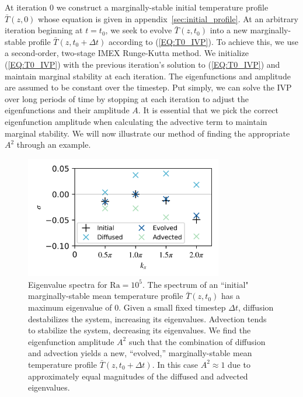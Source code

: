\documentclass[reprint,amsmath,amssymb,aps]{revtex4-1}
\newcommand\Ra{\mathrm{Ra}}
\newcommand{\eq}[1]{(\ref{#1})}
\begin{document}
At iteration 0 we construct a marginally-stable initial temperature profile $\bar{T}(z, 0)$ whose equation is given in appendix~\ref{sec:initial_profile}. 
At an arbitrary iteration beginning at $t = t_0$, we seek to evolve $\bar{T}(z, t_0)$ into a new marginally-stable profile $\bar{T}(z, t_0 + \Delta t)$ according to \eq{EQ:T0_IVP}. 
To achieve this, we use a second-order, two-stage IMEX Runge-Kutta method.
We initialize \eq{EQ:T0_IVP} with the previous iteration's solution to \eq{EQ:T0_IVP} and maintain marginal stability at each iteration.
The eigenfunctions and amplitude are assumed to be constant over the timestep.
Put simply, we can solve the IVP over long periods of time by stopping at each iteration to adjust the eigenfunctions and their amplitude $A$.
It is essential that we pick the correct eigenfunction amplitude when calculating the advective term to maintain marginal stability.
We will now illustrate our method of finding the appropriate $A^2$ through an example.

\begin{figure}
    \includegraphics[width=3.4in]{EV_spectrum_ol.png}
    \caption{Eigenvalue spectra for $\Ra = 10^5$. The spectrum of an ``initial" marginally-stable mean temperature profile $\bar{T}(z, t_0)$ has a maximum eigenvalue of 0. 
    Given a small fixed timestep $\Delta t$, diffusion destabilizes the system, increasing its eigenvalues. 
    Advection tends to stabilize the system, decreasing its eigenvalues. 
    We find the eigenfunction amplitude $A^2$ such that the combination of diffusion and advection yields a new, ``evolved,'' marginally-stable mean temperature profile $\bar{T}(z, t_0 + \Delta t)$. In this case $A^2 \approx 1$ due to approximately equal magnitudes of the diffused and advected eigenvalues.}
    \label{fig:iteration_spectra} 
\end{figure}
\end{document}
